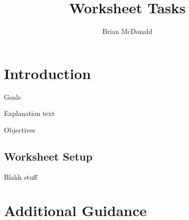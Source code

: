 \documentclass{../../../fal_assignment}
\title{Worksheet Tasks}
\author{Brian McDonald} %
\begin{document}

\section*{Introduction}


Goals

Explanation text

Objectives


\subsection*{Worksheet Setup}

Blahh stuff

\section*{Additional Guidance}
\end{document}
